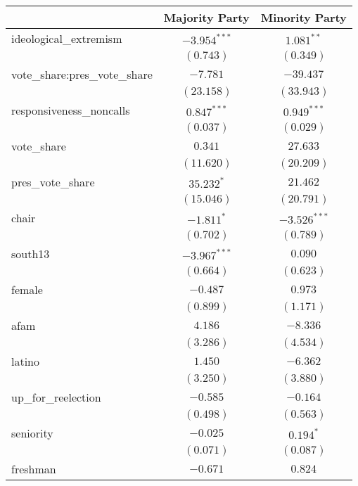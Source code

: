 \documentclass[12pt]{article}
\begin{document}
\begin{table}
	\begin{center}
		\begin{tabular}{l c c }
			\hline
			& Majority Party & Minority Party \\
			\hline
			ideological\_extremism        & $-3.954^{***}$ & $1.081^{**}$   \\
			& $(0.743)$      & $(0.349)$      \\
			vote\_share:pres\_vote\_share & $-7.781$       & $-39.437$      \\
			& $(23.158)$     & $(33.943)$     \\
			responsiveness\_noncalls      & $0.847^{***}$  & $0.949^{***}$  \\
			& $(0.037)$      & $(0.029)$      \\
			vote\_share                   & $0.341$        & $27.633$       \\
			& $(11.620)$     & $(20.209)$     \\
			pres\_vote\_share             & $35.232^{*}$   & $21.462$       \\
			& $(15.046)$     & $(20.791)$     \\
			chair                         & $-1.811^{*}$   & $-3.526^{***}$ \\
			& $(0.702)$      & $(0.789)$      \\
			south13                       & $-3.967^{***}$ & $0.090$        \\
			& $(0.664)$      & $(0.623)$      \\
			female                        & $-0.487$       & $0.973$        \\
			& $(0.899)$      & $(1.171)$      \\
			afam                          & $4.186$        & $-8.336$       \\
			& $(3.286)$      & $(4.534)$      \\
			latino                        & $1.450$        & $-6.362$       \\
			& $(3.250)$      & $(3.880)$      \\
			up\_for\_reelection           & $-0.585$       & $-0.164$       \\
			& $(0.498)$      & $(0.563)$      \\
			seniority                     & $-0.025$       & $0.194^{*}$    \\
			& $(0.071)$      & $(0.087)$      \\
			freshman                      & $-0.671$       & $0.824$        \\

\end{tabular}
\end{center}
\end{table}
\end{document}

